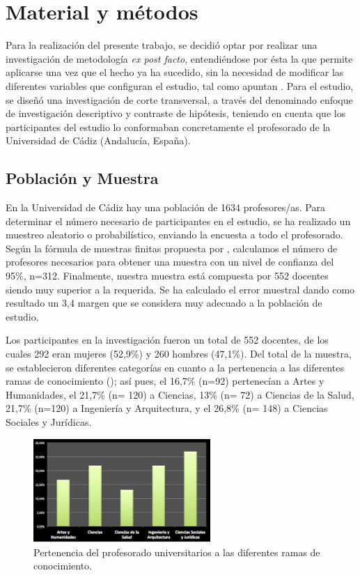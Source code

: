 \documentclass[spanish]{textolivre}
\begin{document}
\section{Material y métodos}
Para la realización del presente trabajo, se decidió optar por realizar una investigación de metodología \textit{ex post facto}, entendiéndose por ésta la que permite aplicarse una vez que el hecho ya ha sucedido, sin la necesidad de modificar las diferentes variables que configuran el estudio, tal como apuntan \textcite{hernandez2014}. Para el estudio, se diseñó una investigación de corte transversal, a través del denominado enfoque de investigación descriptivo y contraste de hipótesis, teniendo en cuenta que los participantes del estudio lo conformaban concretamente el profesorado de la Universidad de Cádiz (Andalucía, España). 

\subsection{Población y Muestra}
En la Universidad de Cádiz hay una población de 1634 profesores/as. Para determinar el número necesario de participantes en el estudio, se ha realizado un muestreo aleatorio o probabilístico, enviando la encuesta a todo el profesorado. Según la fórmula de muestras finitas propuesta por \textcite[p. 226]{sierra1988}, calculamos el número de profesores necesarios para obtener una muestra con un nivel de confianza del 95\%, n=312. Finalmente, nuestra muestra está compuesta por 552 docentes siendo muy superior a la requerida. Se ha calculado el error muestral dando como resultado un 3,4 margen que se considera muy adecuado a la población de estudio.

Los participantes en la investigación fueron un total de 552 docentes, de los cuales 292 eran mujeres (52,9\%) y 260 hombres (47,1\%). Del total de la muestra, se establecieron diferentes categorías en cuanto a la pertenencia a las diferentes ramas de conocimiento (); así pues, el 16,7\% (n=92) pertenecían a Artes y Humanidades, el 21,7\% (n= 120) a Ciencias, 13\% (n= 72) a Ciencias de la Salud, 21,7\% (n=120) a Ingeniería y Arquitectura, y el 26,8\% (n= 148) a Ciencias Sociales y Jurídicas.

\begin{figure}[htbp]
 \centering
 \includegraphics[width=0.6\textwidth]{fig1-36032.png}
 \caption{Pertenencia del profesorado universitarios a las diferentes ramas de conocimiento.}
 \label{fig1}
\end{figure}
\end{document}

